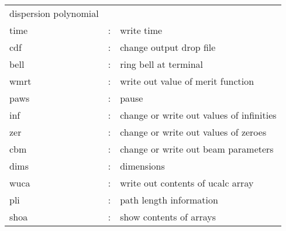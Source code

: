 \begin{table}
\begin{center}
\begin{tabular}{lll}
dispersion polynomial\\ time &: & write time\\ cdf &: & change output drop
file\\ bell &: & ring bell at terminal\\ wmrt &: & write out value of merit
function\\ paws &: & pause\\ inf &: & change or write out values of
infinities\\ zer &: & change or write out values of zeroes \\ cbm
&: & change or write out beam parameters\\ dims &: & dimensions\\ wuca &: &
write out contents of ucalc array\\ pli &: & path length information \\ shoa &: & show contents of arrays
\end{tabular} \end{center} \end{table}


